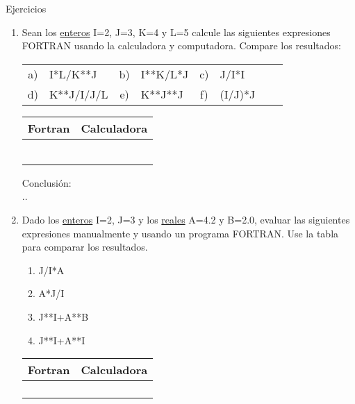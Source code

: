 \documentclass[11pt]{exam}
\begin{document}
\large{Ejercicios}
\begin{enumerate}
 \item 
Sean los \underline{enteros} I=2, J=3, K=4 y L=5 calcule las siguientes expresiones FORTRAN usando la calculadora y  computadora. Compare los resultados:\\
\begin{tabular}{clclclcl}
      a)& I*L/K**J & b)&  I**K/L*J &c)&  J/I*I \\
      d)&  K**J/I/J/L &e)& K**J**J  &f)&   (I/J)*J   \\
\end{tabular}
\begin{minipage}{5cm}
\begin{tabular}{|p{3cm}|p{3cm}|}
\hline 
 Fortran& Calculadora\\ \hline \hline
 &\\ \hline
 &\\ \hline
 &\\ \hline
&\\ \hline
 &\\ \hline
&\\ \hline
\end{tabular}

\end{minipage}
\par

Conclusi\'on: \dotfill \\
..\dotfill

 
 \item 
Dado los \underline{enteros} I=2, J=3 y los \underline{reales} A=4.2 y B=2.0, evaluar las siguientes 
expresiones manualmente y usando un programa FORTRAN. Use la tabla para comparar los resultados.\\
\begin{minipage}{5cm}
\vspace{0.5cm}
   \begin{enumerate}
	\item  J/I*A
	\item  A*J/I
	\item J**I+A**B
	\item J**I+A**I
    \end{enumerate}
\end{minipage}
\begin{minipage}{5cm}
\begin{tabular}{|p{3cm}|p{3cm}|}
\hline 
 Fortran& Calculadora\\ \hline \hline
 &\\ \hline
 &\\ \hline
 &\\ \hline
&\\ \hline
\end{tabular}


\end{minipage}
\end{enumerate}
\end{document}

